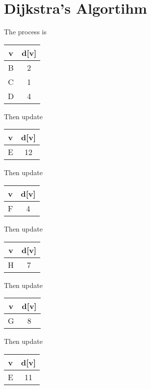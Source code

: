\documentclass[a4paper]{article}
\begin{document}
\section{Dijkstra's Algortihm}
The process is 
\begin{center}
  \begin{tabular}{ |c|c| }
    \hline
    v & d[v] \\ \hline
    B & 2\\
    C & 1\\
    D & 4\\
    \hline
  \end{tabular}
\end{center}
Then update
\begin{center}
  \begin{tabular}{ |c|c| }
    \hline
    v & d[v] \\ \hline
    E & 12 \\
    \hline
  \end{tabular}
\end{center}
Then update
\begin{center}
  \begin{tabular}{ |c|c| }
    \hline
    v & d[v] \\ \hline
    F & 4 \\
    \hline
  \end{tabular}
\end{center}
Then update\begin{center}
  \begin{tabular}{ |c|c| }
    \hline
    v & d[v] \\ \hline
    H & 7 \\
    \hline
  \end{tabular}
\end{center}

Then update\begin{center}
  \begin{tabular}{ |c|c| }
    \hline
    v & d[v] \\ \hline
    G & 8 \\
    \hline
  \end{tabular}
\end{center}

Then update
\begin{center}
  \begin{tabular}{ |c|c| }
    \hline
    v & d[v] \\ \hline
    E & 11 \\
    \hline
  \end{tabular}
\end{center}
\end{document}
